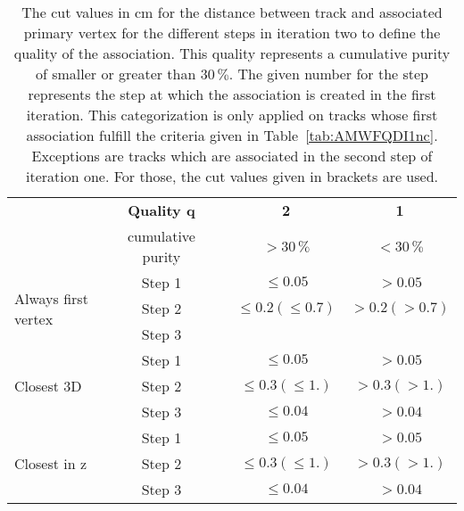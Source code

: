 
\begin{table}[h]
\begin{center}
\caption{The cut values in cm for the distance between track and associated primary vertex for the different steps in iteration two to define the quality of the association. This quality represents a  cumulative purity of smaller or greater than $30\,\%$. The given number for the step represents the step at which the association is created in the first iteration. This categorization is only applied on tracks whose first association fulfill the criteria given in Table~\ref{tab:AMWFQDI1nc}. Exceptions are tracks which are associated in the second step of iteration one. For those, the cut values given in brackets are used.}
\label{tab:AMWFQDI2}

\begin{tabular}{l c c c c}
 	& \textbf{Quality q} & & \textbf{2} & \textbf{1}  \\
 	& cumulative purity & & $>30\,\%$ & $<30\,\%$    \\
\midrule[2pt]
\multirow{3}{*}{Always first vertex} 
	& Step 1 & & $\leq0.05$ & $>0.05$ \\
\cmidrule{2-5} 
	 & Step 2 & & $\leq0.2 \left(\leq0.7\right)$ & $>0.2\left(>0.7\right)$ \\
\cmidrule{2-5} 
	& Step 3 & &  &  \\
\midrule[2pt]
\multirow{3}{*}{Closest 3D} 
	& Step 1 & & $\leq0.05$ & $>0.05$ \\
\cmidrule{2-5} 
	 &  Step 2 & & $\leq0.3 \left(\leq1.\right)$ & $>0.3\left(>1.\right)$ \\
\cmidrule{2-5} 
	& Step 3 & & $\leq0.04$ & $>0.04$ \\
\midrule[2pt]
\multirow{3}{*}{Closest in z} 
	& Step 1 & & $\leq0.05$ & $>0.05$ \\
\cmidrule{2-5} 
	 &  Step 2 & & $\leq0.3 \left(\leq1.\right)$ & $>0.3\left(>1.\right)$ \\
\cmidrule{2-5} 
	& Step 3 & & $\leq0.04$ & $>0.04$ \\
\end{tabular}

\end{center}
\end{table}